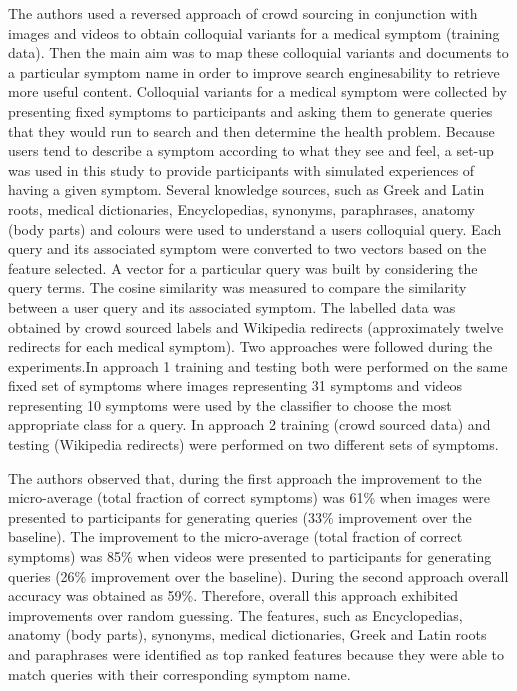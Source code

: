 \documentclass[]{article}
\begin{document}
\begin{enumerate}
The authors used a reversed approach of crowd sourcing in conjunction with images and videos to obtain colloquial variants for a medical symptom (training data). Then the main aim was to map these colloquial variants and documents to a particular symptom name in order to improve search engines\textquotesingle ability to retrieve more useful content. Colloquial variants for a medical symptom were collected by presenting fixed symptoms to participants and asking them to generate queries that they would run to search and then determine the health problem. Because users tend to describe a symptom according to what they see and feel, a set-up was used in this study to provide participants with simulated experiences of having a given symptom. Several knowledge sources, such as Greek and Latin roots, medical dictionaries, Encyclopedias, synonyms, paraphrases, anatomy (body parts) and colours were used to understand a user\textquotesingle s colloquial query. Each query and its associated symptom were converted to two vectors based on the feature selected. A vector for a particular query was built by considering the query terms. The cosine similarity was measured to compare the similarity between a user query and its associated symptom. The labelled data was obtained by crowd sourced labels and Wikipedia redirects (approximately twelve redirects for each medical symptom). Two approaches were followed during the experiments.In approach 1 training and testing both were performed on the same fixed set of symptoms where images representing 31 symptoms and videos representing 10 symptoms were used by the classifier to choose the most appropriate class for a query. In approach 2 training (crowd sourced data) and testing (Wikipedia redirects) were performed on two different sets of symptoms.     

The authors observed that, during the first approach the improvement to the micro-average (total fraction of correct symptoms) was 61\% when images were presented to participants for generating queries (33\% improvement over the baseline). The improvement to the micro-average (total fraction of correct symptoms) was 85\% when videos were presented to participants for generating queries (26\% improvement over the baseline). During the second approach overall accuracy was obtained as 59\%. Therefore, overall this approach exhibited improvements over random guessing. The features, such as Encyclopedias, anatomy (body parts), synonyms, medical dictionaries, Greek and Latin roots and paraphrases were identified as top ranked features because they were able to match queries with their corresponding symptom name. 


\end{enumerate}
\end{document}
